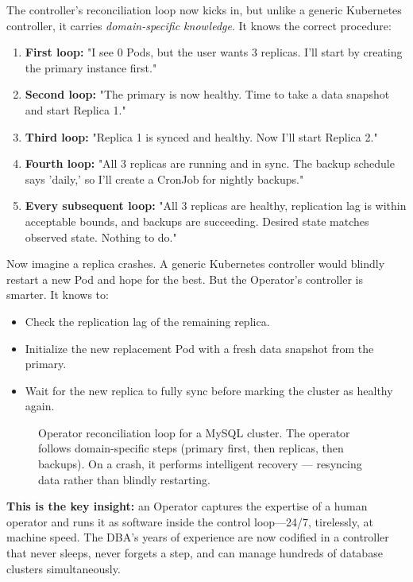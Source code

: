 The controller's reconciliation loop now kicks in, but unlike a generic Kubernetes controller, it carries \textit{domain-specific knowledge}. It knows the correct procedure:

\begin{enumerate}
\item \textbf{First loop:} "I see 0 Pods, but the user wants 3 replicas. I'll start by creating the primary instance first."
\item \textbf{Second loop:} "The primary is now healthy. Time to take a data snapshot and start Replica 1."
\item \textbf{Third loop:} "Replica 1 is synced and healthy. Now I'll start Replica 2."
\item \textbf{Fourth loop:} "All 3 replicas are running and in sync. The backup schedule says 'daily,' so I'll create a CronJob for nightly backups."
\item \textbf{Every subsequent loop:} "All 3 replicas are healthy, replication lag is within acceptable bounds, and backups are succeeding. Desired state matches observed state. Nothing to do."
\end{enumerate}

Now imagine a replica crashes. A generic Kubernetes controller would blindly restart a new Pod and hope for the best. But the Operator's controller is smarter. It knows to:
\begin{itemize}
\item Check the replication lag of the remaining replica.
\item Initialize the new replacement Pod with a fresh data snapshot from the primary.
\item Wait for the new replica to fully sync before marking the cluster as healthy again.
\end{itemize}
\begin{figure}[htbp]
\centering

\caption{Operator reconciliation loop for a MySQL cluster. The operator follows domain-specific steps (primary first, then replicas, then backups). On a crash, it performs intelligent recovery --- resyncing data rather than blindly restarting.}
\label{fig:6_2}
\end{figure}



\textbf{This is the key insight:} an Operator captures the expertise of a human operator and runs it as software inside the control loop---24/7, tirelessly, at machine speed. The DBA's years of experience are now codified in a controller that never sleeps, never forgets a step, and can manage hundreds of database clusters simultaneously.

